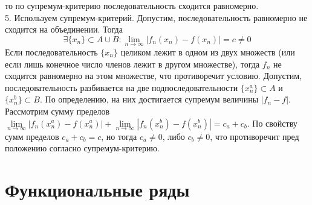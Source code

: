 то по супремум-критерию последовательность сходится равномерно.\\
5. Используем супремум-критерий. 
Допустим, последовательность равномерно не сходится на объединении.
Тогда 
$$\exists \{x_n\}\subset A\cup B:
\lim\limits_{n \to \infty}|f_n(x_n)-f(x_n)|=c\ne0$$
Если последовательность $\{x_n\} $ целиком лежит в одном из двух множеств
(или если лишь конечное число членов лежит в другом множестве),
тогда $f_n$ не сходится равномерно на этом множестве, что противоречит 
условию. Допустим, последовательность разбивается на две 
подпоследовательности $\{x^a_n\}\subset A$ и $\{x^b_n\}\subset B$. 
По определению, на них достигается супремум величины $|f_n-f|$. 
Рассмотрим сумму пределов
$\lim\limits_{n \to \infty}|f_n(x^a_n)-f(x^a_n)|+
\lim\limits_{n \to \infty}|f_n(x^b_n)-f(x^b_n)|=c_a+c_b$. По свойству сумм
пределов $c_a+c_b=c$, но тогда  $c_a\ne 0$, либо  $c_b\ne 0$, что 
противоречит пред положению согласно супремум-критерию.
\section{Функциональные ряды}
